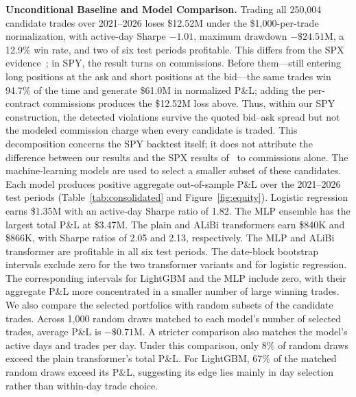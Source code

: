\documentclass[sigconf,review]{acmart}
\begin{document}
\smallskip\noindent\textbf{Unconditional Baseline and Model Comparison.}
Trading all 250{,}004 candidate trades over 2021--2026 loses \$12.52M under the \$1{,}000-per-trade normalization, with active-day Sharpe $-1.01$, maximum drawdown $-\$24.51$M, a 12.9\% win rate, and two of six test periods profitable.
This differs from the SPX evidence~\cite{glasserman2025tp2}; in SPY, the result turns on commissions. Before them---still entering long positions at the ask and short positions at the bid---the same trades win 94.7\% of the time and generate \$61.0M in normalized P\&L; adding the per-contract commissions produces the \$12.52M loss above. Thus, within our SPY construction, the detected violations survive the quoted bid--ask spread but not the modeled commission charge when every candidate is traded. This decomposition concerns the SPY backtest itself; it does not attribute the difference between our results and the SPX results of~\cite{glasserman2025tp2} to commissions alone.
The machine-learning models are used to select a smaller subset of these candidates. Each model produces positive aggregate out-of-sample P\&L over the 2021--2026 test periods (Table~\ref{tab:consolidated} and Figure~\ref{fig:equity}). Logistic regression earns \$1.35M with an active-day Sharpe ratio of 1.82. The MLP ensemble has the largest total P\&L at \$3.47M. The plain and ALiBi transformers earn \$840K and \$866K, with Sharpe ratios of 2.05 and 2.13, respectively. The MLP and ALiBi transformer are profitable in all six test periods.
The date-block bootstrap intervals exclude zero for the two transformer variants and for logistic regression. The corresponding intervals for LightGBM and the MLP include zero, with their aggregate P\&L more concentrated in a smaller number of large winning trades.
We also compare the selected portfolios with random subsets of the candidate trades. Across 1{,}000 random draws matched to each model's number of selected trades, average P\&L is $-\$0.71$M. A stricter comparison also matches the model's active days and trades per day. Under this comparison, only 8\% of random draws exceed the plain transformer's total P\&L. For LightGBM, 67\% of the matched random draws exceed its P\&L, suggesting its edge lies mainly in day selection rather than within-day trade choice.
\end{document}
